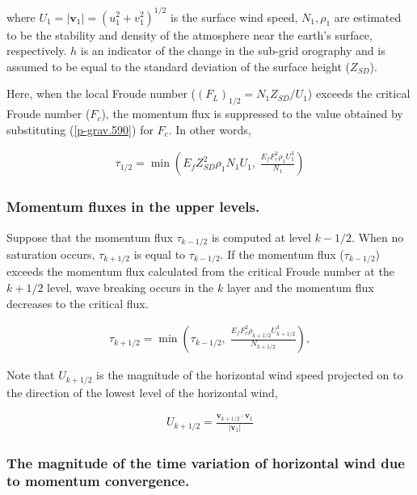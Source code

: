 where \(U_1 = |{\mathbf v}_1| = (u_1^2 + v_1^2)^{1/2}\) is the surface
wind speed, \(N_1, \rho_1\) are estimated to be the stability and
density of the atmosphere near the earth's surface, respectively. \(h\)
is an indicator of the change in the sub-grid orography and is assumed
to be equal to the standard deviation of the surface height
(\(Z_{SD}\)).

Here, when the local Froude number (\((F_L)_{1/2} = N_1 Z_{SD}/U_1\))
exceeds the critical Froude number (\(F_c\)), the momentum flux is
suppressed to the value obtained by substituting
(\ref{p-grav.590}) for \(F_c\). In other words,

\begin{eqnarray}
  \tau_{1/2} = \min \left(
                   E_f Z_{SD}^{2} \rho_1 N_1 U_1, \;
                  \frac{E_f F_c^{2} \rho_1 U_1^3}{N_1}
               \right)
\end{eqnarray}

\hypertarget{momentum-fluxes-in-the-upper-levels.}{%
\subsubsection{Momentum fluxes in the upper
levels.}\label{momentum-fluxes-in-the-upper-levels.}}

Suppose that the momentum flux \(\tau_{k-1/2}\) is computed at level
\(k-1/2\). When no saturation occurs, \(\tau_{k+1/2}\) is equal to
\(\tau_{k-1/2}\). If the momentum flux (\(\tau_{k-1/2}\)) exceeds the
momentum flux calculated from the critical Froude number at the
\(k+1/2\) level, wave breaking occurs in the \(k\) layer and the
momentum flux decreases to the critical flux.

\begin{eqnarray}
  \tau_{k+1/2} = \min \left(
               \tau_{k-1/2}, \;
               \frac{E_f F_c^2 \rho_{k+1/2} U_{k+1/2}^3}{N_{k+1/2}}
                      \right),
\end{eqnarray}

Note that \(U_{k+1/2}\) is the magnitude of the horizontal wind speed
projected on to the direction of the lowest level of the horizontal
wind,

\begin{eqnarray}
  U_{k+1/2} = \frac{{\mathbf v}_{k+1/2}
                      \cdot {\mathbf v}_{1}}
                   {|{\mathbf v}_{1}|       }
\end{eqnarray}

\hypertarget{the-magnitude-of-the-time-variation-of-horizontal-wind-due-to-momentum-convergence.}{%
\subsubsection{The magnitude of the time variation of horizontal wind
due to momentum
convergence.}\label{the-magnitude-of-the-time-variation-of-horizontal-wind-due-to-momentum-convergence.}}

